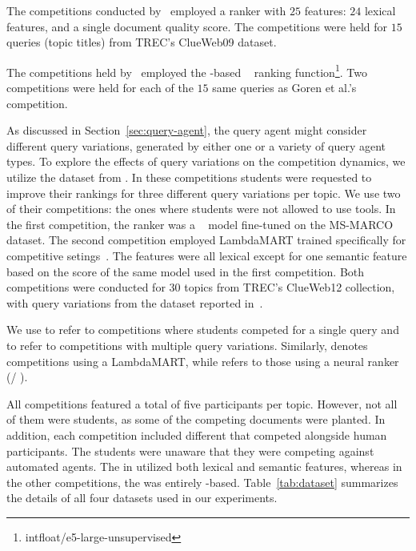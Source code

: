 

The competitions conducted by~\citet{Greg-bot} employed a \lambdamart
ranker \cite{wu2010adapting} with $25$ features: $24$ lexical
features, and a single document quality score.  The competitions were held for
$15$ queries (topic titles) from TREC's ClueWeb09 dataset.

The competitions held by~\citet{Niv} employed the \efive-based ~\cite{e5} ranking function\footnote{intfloat/e5-large-unsupervised}. Two competitions were held for each of the $15$ same queries as Goren et al.'s~\cite{Greg-bot} competition.

As discussed in Section~\ref{sec:query-agent}, the query agent might consider different query variations, generated by either one or a variety of query agent types. 
To explore the effects of query variations on the competition dynamics, we utilize the dataset from \citet{MultQueries}. In these competitions students were requested to improve their rankings for three different query variations per topic. We use two of their competitions: the ones where students were not allowed to use \llm tools.
In the first competition, the ranker was a \bert~\cite{BERT} model fine-tuned on the MS-MARCO dataset.
The second competition employed LambdaMART trained specifically for competitive setings~\cite{Ziv-Ranker}.
The features were all lexical except for one semantic feature based on the score of the same \bert model used in the first competition.  
Both competitions were conducted for $30$ topics from TREC's ClueWeb12 collection, with query variations from the dataset reported in~\cite{uqv100}.

We use \firstmention{\single} to refer to competitions where students competed for a single query and \firstmention{\multi} 
to refer to competitions with multiple query variations. Similarly, \firstmention{\ltr} denotes competitions using a LambdaMART,
while \firstmention{\neu} refers to those using a neural ranker (\bert / \efive). 

All competitions featured a total of five participants per topic. However, not all of them were students, as some of the competing documents were planted. 
In addition, each competition included different \botagents that competed alongside human participants. The students were unaware that they were competing against automated agents. The \botagent in \GregDataset utilized both lexical and semantic features, whereas in the other competitions, the \botagent was entirely \llm-based.
Table~\ref{tab:dataset} summarizes the details of all four datasets used in our experiments.


